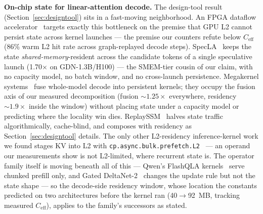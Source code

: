 \textbf{On-chip state for linear-attention decode.}  The design-tool result (Section~\ref{sec:designtool}) sits in a fast-moving neighborhood.  An FPGA dataflow accelerator~\cite{gupta2026persistentstate} targets exactly this bottleneck on the premise that GPU L2 cannot persist state across kernel launches --- the premise our counters refute below $C_\text{eff}$ (86\% warm L2 hit rate across graph-replayed decode steps).  SpecLA~\cite{wang2026specla} keeps the state \emph{shared-memory}-resident across the candidate tokens of a single speculative launch (1.70$\times$ on GDN-1.3B/H100) --- the SMEM-tier cousin of our claim, with no capacity model, no batch window, and no cross-launch persistence.  Megakernel systems~\cite{automegakernel2026} fuse whole-model decode into persistent kernels; they occupy the fusion axis of our measured decomposition (fusion ${\sim}1.25\times$ everywhere, residency ${\sim}1.9\times$ inside the window) without placing state under a capacity model or predicting where the locality win dies.  ReplaySSM~\cite{dao2026replayssm} halves state traffic algorithmically, cache-blind, and composes with residency as Section~\ref{sec:designtool} details.  The only other L2-residency inference-kernel work we found stages KV into L2 with \texttt{cp.async.bulk.prefetch.L2}~\cite{kvprefetch2025} --- an operand our measurements show is not L2-limited, where recurrent state is.  The operator family itself is moving beneath all of this --- Qwen's FlashQLA kernels~\cite{flashqla2026} serve chunked prefill only, and Gated DeltaNet-2~\cite{nvidia2026gdn2} changes the update rule but not the state shape --- so the decode-side residency window, whose location the constants predicted on two architectures before the kernel ran (40${\to}$92~MB, tracking measured $C_\text{eff}$), applies to the family's successors as stated.
